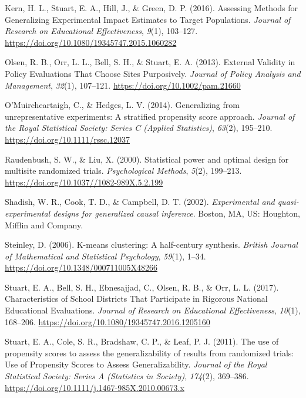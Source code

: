 \documentclass[man,floatsintext]{apa6}
\begin{document}
\leavevmode\hypertarget{ref-kernAssessingMethodsGeneralizing2016}{}%
Kern, H. L., Stuart, E. A., Hill, J., \& Green, D. P. (2016). Assessing Methods for Generalizing Experimental Impact Estimates to Target Populations. \emph{Journal of Research on Educational Effectiveness}, \emph{9}(1), 103--127. \url{https://doi.org/10.1080/19345747.2015.1060282}

\leavevmode\hypertarget{ref-olsenExternalValidityPolicy2013}{}%
Olsen, R. B., Orr, L. L., Bell, S. H., \& Stuart, E. A. (2013). External Validity in Policy Evaluations That Choose Sites Purposively. \emph{Journal of Policy Analysis and Management}, \emph{32}(1), 107--121. \url{https://doi.org/10.1002/pam.21660}

\leavevmode\hypertarget{ref-omuircheartaighGeneralizingUnrepresentativeExperiments2014}{}%
O'Muircheartaigh, C., \& Hedges, L. V. (2014). Generalizing from unrepresentative experiments: A stratified propensity score approach. \emph{Journal of the Royal Statistical Society: Series C (Applied Statistics)}, \emph{63}(2), 195--210. \url{https://doi.org/10.1111/rssc.12037}

\leavevmode\hypertarget{ref-raudenbushStatisticalPowerOptimal2000}{}%
Raudenbush, S. W., \& Liu, X. (2000). Statistical power and optimal design for multisite randomized trials. \emph{Psychological Methods}, \emph{5}(2), 199--213. \url{https://doi.org/10.1037//1082-989X.5.2.199}

\leavevmode\hypertarget{ref-shadishExperimentalQuasiexperimentalDesigns2002}{}%
Shadish, W. R., Cook, T. D., \& Campbell, D. T. (2002). \emph{Experimental and quasi-experimental designs for generalized causal inference}. Boston, MA, US: Houghton, Mifflin and Company.

\leavevmode\hypertarget{ref-steinleyKmeansClusteringHalfcentury2006}{}%
Steinley, D. (2006). K-means clustering: A half-century synthesis. \emph{British Journal of Mathematical and Statistical Psychology}, \emph{59}(1), 1--34. \url{https://doi.org/10.1348/000711005X48266}

\leavevmode\hypertarget{ref-stuartCharacteristicsSchoolDistricts2017}{}%
Stuart, E. A., Bell, S. H., Ebnesajjad, C., Olsen, R. B., \& Orr, L. L. (2017). Characteristics of School Districts That Participate in Rigorous National Educational Evaluations. \emph{Journal of Research on Educational Effectiveness}, \emph{10}(1), 168--206. \url{https://doi.org/10.1080/19345747.2016.1205160}

\leavevmode\hypertarget{ref-stuartUsePropensityScores2011}{}%
Stuart, E. A., Cole, S. R., Bradshaw, C. P., \& Leaf, P. J. (2011). The use of propensity scores to assess the generalizability of results from randomized trials: Use of Propensity Scores to Assess Generalizability. \emph{Journal of the Royal Statistical Society: Series A (Statistics in Society)}, \emph{174}(2), 369--386. \url{https://doi.org/10.1111/j.1467-985X.2010.00673.x}
\end{document}
